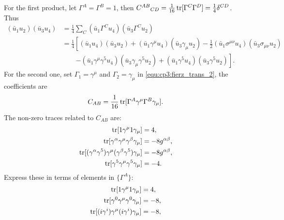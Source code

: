 \begin{problembody}
    \item For the first product, let $\Gamma^A = \Gamma^B = 1$, then $C^{AB}{}_{CD} = \frac{1}{16}\operatorname{tr}[\Gamma^C\Gamma^D] = \frac{1}{4}\delta^{CD}$.
    Thus
    \begin{align*}
        (\bar{u}_1u_2)(\bar{u}_3u_4) & = \frac{1}{4}\sum_C (\bar{u}_1\Gamma^Cu_4)(\bar{u}_3\Gamma^Cu_2)\\
        & = \frac{1}{4}\left[
            (\bar{u}_1u_4)(\bar{u}_3u_2) 
            + (\bar{u}_1\gamma^\mu u_4)(\bar{u}_3\gamma_\mu u_2)
            - \frac{1}{2}(\bar{u}_1\sigma^{\mu\nu}u_4)(\bar{u}_3\sigma_{\mu\nu}u_2)\right.\\
            & \qquad \left.- (\bar{u}_1\gamma^\mu\gamma^5u_4)(\bar{u}_3\gamma_\mu\gamma^5u_2)
            + (\bar{u}_1\gamma^5u_4)(\bar{u}_3\gamma^5u_2)
        \right].
    \end{align*}
    For the second one, set $\Gamma_1 = \gamma^\mu$ and $\Gamma_2 = \gamma_\mu$ in \eqref{equ:cp3:fierz_trans_2}, the coefficients are
    \begin{equation*}
        C_{AB} = \frac{1}{16}\operatorname{tr}[\Gamma^A\gamma^\mu\Gamma^B\gamma_\mu].
    \end{equation*}
    The non-zero traces related to $C_{AB}$ are:
    \begin{align*}
        \operatorname{tr}[1\gamma^\mu 1\gamma_\mu] & = 4,\\
        \operatorname{tr}[\gamma^\alpha\gamma^\mu\gamma^\beta\gamma_\mu] & = -8g^{\alpha\beta},\\
        \operatorname{tr}[(\gamma^\alpha\gamma^5)\gamma^\mu(\gamma^\beta\gamma^5)\gamma_\mu]
        & = -8g^{\alpha\beta},\\
        \operatorname{tr}[\gamma^5\gamma^\mu\gamma^5\gamma_\mu] & = -4.
    \end{align*}
    Express these in terms of elements in $\{\Gamma^A\}$:
    \begin{align*}
        \tr[1\gamma^\mu 1\gamma_\mu] & = 4,\\
        \tr[\gamma^0\gamma^\mu\gamma^0\gamma_\mu] & = -8,\\
        \tr[(i\gamma^i)\gamma^\mu(i\gamma^i)\gamma_\mu] & = -8,\\

\end{align*}
\end{problembody}
